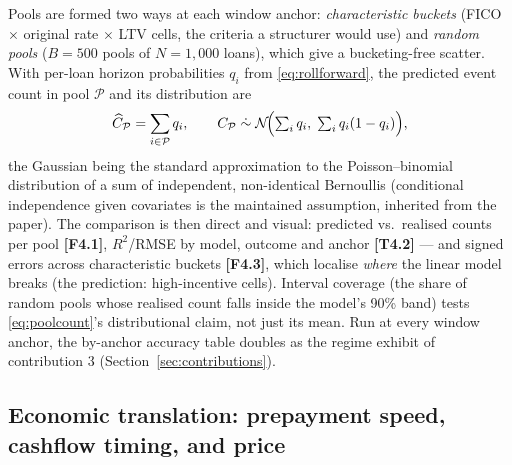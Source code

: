 \documentclass[11pt,a4paper]{article}
\newcommand{\artifact}[1]{\textbf{[#1]}}
\begin{document}
Pools are formed two ways at each window anchor: \emph{characteristic buckets} (FICO $\times$ original rate $\times$ LTV cells, the criteria a structurer would use) and \emph{random pools} ($B{=}500$ pools of $N{=}1{,}000$ loans), which give a bucketing-free scatter. With per-loan horizon probabilities $q_i$ from \eqref{eq:rollforward}, the predicted event count in pool $\mathcal{P}$ and its distribution are
\begin{equation}
\label{eq:poolcount}
\widehat{C}_{\mathcal{P}} = \sum_{i\in\mathcal{P}} q_i,
\qquad
C_{\mathcal{P}} \;\dot\sim\; \mathcal{N}\!\Bigl(\textstyle\sum_i q_i,\; \sum_i q_i(1-q_i)\Bigr),
\end{equation}
the Gaussian being the standard approximation to the Poisson--binomial distribution of a sum of independent, non-identical Bernoullis (conditional independence given covariates is the maintained assumption, inherited from the paper). The comparison is then direct and visual: predicted vs.\ realised counts per pool \artifact{F4.1}, $R^2$/RMSE by model, outcome and anchor \artifact{T4.2} --- and signed errors across characteristic buckets \artifact{F4.3}, which localise \emph{where} the linear model breaks (the prediction: high-incentive cells). Interval coverage (the share of random pools whose realised count falls inside the model's 90\% band) tests \eqref{eq:poolcount}'s distributional claim, not just its mean. Run at every window anchor, the by-anchor accuracy table doubles as the regime exhibit of contribution 3 (Section~\ref{sec:contributions}).

\subsection{Economic translation: prepayment speed, cashflow timing, and price}\label{sec:econtranslation}
\end{document}
